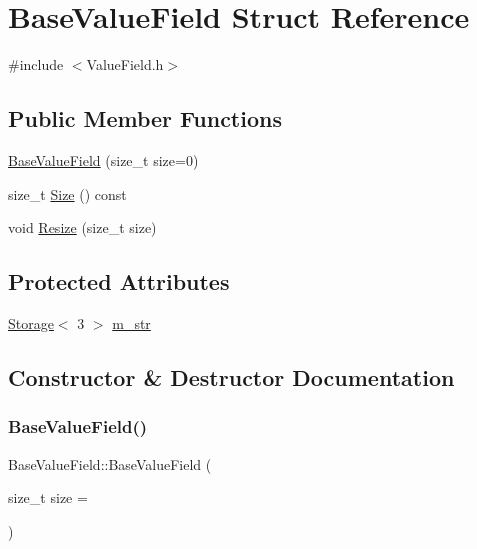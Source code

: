 \hypertarget{structBaseValueField}{}\section{Base\+Value\+Field Struct Reference}
\label{structBaseValueField}


{\ttfamily \#include $<$Value\+Field.\+h$>$}

\subsection*{Public Member Functions}
\begin{DoxyCompactItemize}
\item 
\hyperlink{structBaseValueField_a5dc2c4244ee4c889ccadf4aa82215444}{Base\+Value\+Field} (size\+\_\+t size=0)
\item 
size\+\_\+t \hyperlink{structBaseValueField_a32f9704f6b3685f3fc0b8b4913f4fad0}{Size} () const
\item 
void \hyperlink{structBaseValueField_a71e82d6bfc132cfdcb1312f1f5b6c84f}{Resize} (size\+\_\+t size)
\end{DoxyCompactItemize}
\subsection*{Protected Attributes}
\begin{DoxyCompactItemize}
\item 
\hyperlink{Includes_8h_ae7d375db701e28425a3faea2827f134b}{Storage}$<$ 3 $>$ \hyperlink{structBaseValueField_a2ec4223a453889840cccafed504479bc}{m\+\_\+str}
\end{DoxyCompactItemize}


\subsection{Constructor \& Destructor Documentation}
\mbox{\label{structBaseValueField_a5dc2c4244ee4c889ccadf4aa82215444}} 
\subsubsection{\texorpdfstring{Base\+Value\+Field()}{BaseValueField()}}
{\footnotesize\ttfamily Base\+Value\+Field\+::\+Base\+Value\+Field (\begin{DoxyParamCaption}\item[{size\+\_\+t}]{size = {} }\end{DoxyParamCaption})\hspace{0.3cm}{\ttfamily [explicit]}}



